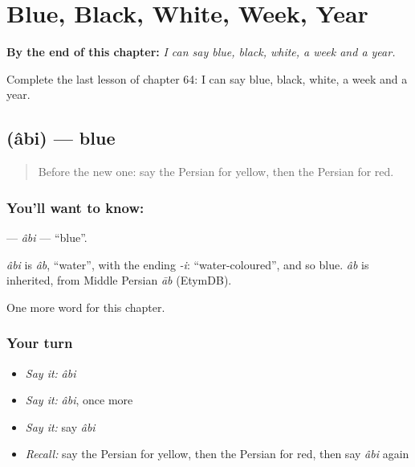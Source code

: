 
\chapter{Blue, Black, White, Week, Year}
\label{ch:fa-blue-black-white-week-year}

\begin{chapteropening}
\textbf{By the end of this chapter:} \emph{I can say blue, black, white, a week and a year.}

Complete the last lesson of chapter 64: I can say blue, black, white, a week and a year.
\end{chapteropening}

\section[\texorpdfstring{\fa{آبی} (âbi)}{آبی (âbi)}]{ (âbi) — blue}

\label{lesson:FA-C64-abi}



\begin{quote}
Before the new one: say the Persian for yellow, then the Persian for red.
\end{quote}

\subsection*{You'll want to know: }
\textbf{} — \emph{âbi} — \textquotedblleft{}blue\textquotedblright{}.

\begin{cousinweb}
\emph{âbi} is \emph{âb}, \textquotedblleft{}water\textquotedblright{}, with the ending \emph{-i}: \textquotedblleft{}water-coloured\textquotedblright{}, and so blue. \emph{âb} is inherited, from Middle Persian \emph{āb} (EtymDB).
\end{cousinweb}

\begin{grammarlens}[title={What you've built}]
One more word for this chapter.
\end{grammarlens}

\subsection*{Your turn}
\begin{itemize}
\raggedright
  \item \emph{Say it:} \emph{âbi}
  \item \emph{Say it:} \emph{âbi}, once more
  \item \emph{Say it:} say \emph{âbi}
  \item \emph{Recall:} say the Persian for yellow, then the Persian for red, then say \emph{âbi} again
\end{itemize}

